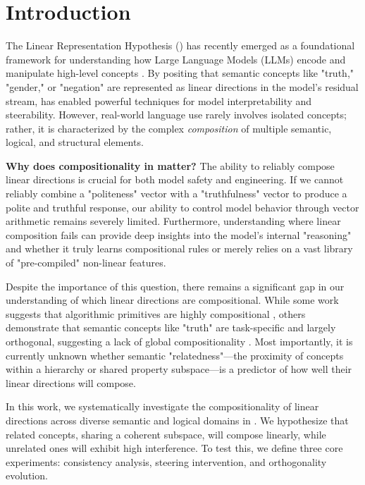 \section{Introduction}
\label{sec:introduction}

The Linear Representation Hypothesis (\lrh) has recently emerged as a foundational framework for understanding how Large Language Models (LLMs) encode and manipulate high-level concepts \cite{park2023linear}. By positing that semantic concepts like "truth," "gender," or "negation" are represented as linear directions in the model's residual stream, \lrh has enabled powerful techniques for model interpretability and steerability. However, real-world language use rarely involves isolated concepts; rather, it is characterized by the complex \textit{composition} of multiple semantic, logical, and structural elements.

{\bf Why does compositionality in \lrh matter?} 
The ability to reliably compose linear directions is crucial for both model safety and engineering. If we cannot reliably combine a "politeness" vector with a "truthfulness" vector to produce a polite and truthful response, our ability to control model behavior through vector arithmetic remains severely limited. Furthermore, understanding where linear composition fails can provide deep insights into the model's internal "reasoning" and whether it truly learns compositional rules or merely relies on a vast library of "pre-compiled" non-linear features.

Despite the importance of this question, there remains a significant gap in our understanding of which linear directions are compositional. While some work suggests that algorithmic primitives are highly compositional \cite{lippl2025algorithmic}, others demonstrate that semantic concepts like "truth" are task-specific and largely orthogonal, suggesting a lack of global compositionality \cite{azizian2025geometries}. Most importantly, it is currently unknown whether semantic "relatedness"---the proximity of concepts within a hierarchy or shared property subspace---is a predictor of how well their linear directions will compose.

In this work, we systematically investigate the compositionality of linear directions across diverse semantic and logical domains in \qwen. We hypothesize that related concepts, sharing a coherent subspace, will compose linearly, while unrelated ones will exhibit high interference. To test this, we define three core experiments: consistency analysis, steering intervention, and orthogonality evolution.

